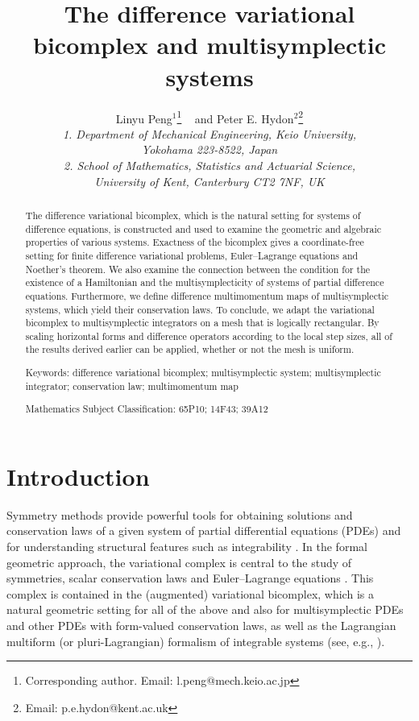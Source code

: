 \documentclass[11pt]{article} %
\title{The difference variational bicomplex and multisymplectic systems}
\author{Linyu Peng$^{1}$\footnote{Corresponding author. Email: l.peng@mech.keio.ac.jp} ~ and Peter E. Hydon{$^2$}\footnote{Email: p.e.hydon@kent.ac.uk} \vspace{0.4cm}
\\
{\it 1. Department of Mechanical Engineering, Keio University,} \\
{\it Yokohama 223-8522, Japan}\\
{\it 2. School of Mathematics, Statistics and Actuarial Science,} \\
{\it University of Kent,  Canterbury CT2 7NF, UK}\\ }
\numberwithin{equation}{section}
\theoremstyle{plain}
\theoremstyle{definition}
\begin{document}
\maketitle

\begin{abstract}
The difference variational bicomplex, which is the natural setting for systems of difference equations, is constructed and used to examine the geometric and algebraic properties of various systems. Exactness of the bicomplex gives a coordinate-free setting for finite difference variational problems, Euler--Lagrange equations and Noether's theorem. We also examine the connection between the condition for the existence of a Hamiltonian and the multisymplecticity of systems of partial difference equations. Furthermore, we define difference multimomentum maps of multisymplectic systems, which yield their conservation laws.
To conclude, we adapt the variational bicomplex to multisymplectic integrators on a mesh that is logically rectangular. By scaling horizontal forms and difference operators according to the local step sizes, all of the results derived earlier can be applied, whether or not the mesh is uniform.
\vspace{0.2cm}

{Keywords: difference variational bicomplex; multisymplectic
system; multisymplectic integrator; conservation law; multimomentum map}\vspace{0.2cm}

{Mathematics Subject Classification: 65P10;  14F43;  39A12}

\end{abstract}



\section{Introduction}
Symmetry methods provide powerful tools for obtaining solutions and conservation laws of a given system of partial differential equations (PDEs) and for understanding structural features such as integrability \cite{BCA2010,Hy2000b,Ol1993}. In the formal geometric approach, the variational complex is central to the study
of symmetries, scalar conservation laws and Euler--Lagrange equations \cite{KO2003,Ol1993}. 
This complex is contained in the (augmented) variational bicomplex, which is a natural geometric setting for all of the above and also for multisymplectic PDEs \cite{BrHyLa2010} and other PDEs with form-valued conservation laws, as well as the Lagrangian multiform (or pluri-Lagrangian) formalism of integrable systems (see, e.g., \cite{LN2009,SV2016,SNC2020}).
\end{document}
